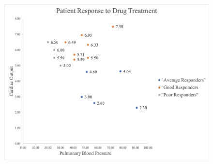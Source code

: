 \documentclass[11pt,addpoints,answers]{exam}
\begin{document}
        \begin{figure}[H]
        \centering
        \includegraphics[width=1\textwidth]{figs/patients.png}
        \end{figure}
\end{document}
